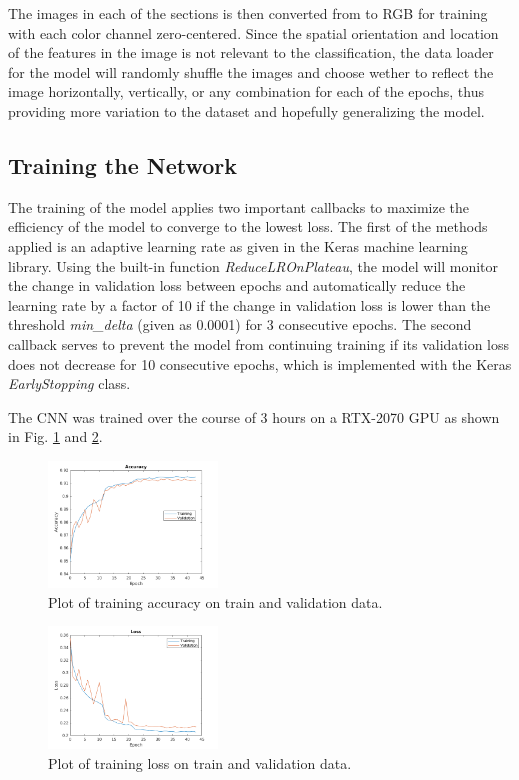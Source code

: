 \documentclass[conference]{IEEEtran}
\begin{document}
The images in each of the sections is then converted from to RGB for training with each color channel zero-centered. Since the spatial orientation and location of the features in the image is not relevant to the classification, the data loader for the model will randomly shuffle the images and choose wether to reflect the image horizontally, vertically, or any combination for each of the epochs, thus providing more variation to the dataset and hopefully generalizing the model.

\subsection{Training the Network}
 The training of the model applies two important callbacks to maximize the efficiency of the model to converge to the lowest loss. The first of the methods applied is an adaptive learning rate as given in the Keras machine learning library. Using the built-in function \emph{ReduceLROnPlateau}, the model will monitor the change in validation loss between epochs and automatically reduce the learning rate by a factor of 10 if the change in validation loss is lower than the threshold \emph{min\_delta} (given as 0.0001) for 3 consecutive epochs. The second callback serves to prevent the model from continuing training if its validation loss does not decrease for 10 consecutive epochs, which is implemented with the Keras \emph{EarlyStopping} class.

The CNN was trained over the course of 3 hours on a RTX-2070 GPU as shown in Fig. \ref{training_accuracy} and \ref{training_loss}.

\begin{figure}
\centering
\includegraphics[width=0.4\textwidth]{figures/training_accuracy.png}
\caption{Plot of training accuracy on train and validation data.}
\label{training_accuracy}
\end{figure}

\begin{figure}
\centering
\includegraphics[width=0.4\textwidth]{figures/training_loss.png}
\caption{Plot of training loss on train and validation data.}
\label{training_loss}
\end{figure}
\end{document}
